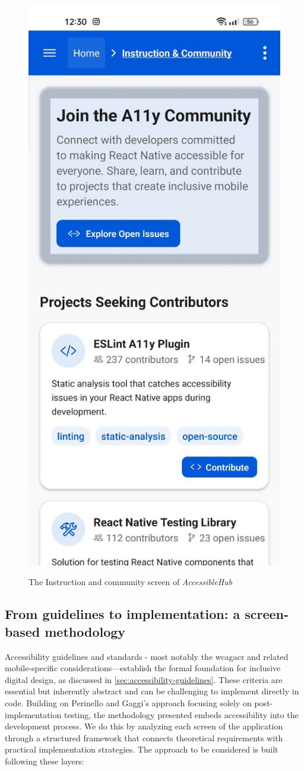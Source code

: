 \begin{enumerate}
\begin{figure}[ht]
\centering
\includegraphics[width=0.4\linewidth, alt={Screenshot of the Instruction and community screen of AccessibleHub}]{img/instruction-community.jpg}
\caption{The Instruction and community screen of \textit{AccessibleHub}}\label{fig:instruction-community}
\end{figure}
    
\end{enumerate}

\pagebreak

\subsection{From guidelines to implementation: a screen-based methodology}
\label{sec:accessiblehub-screen-methodology}

Accessibility guidelines and standards - most notably the \acrshort{wcagacr}  and related mobile-specific considerations—establish the formal foundation for inclusive digital design, as discussed in \ref{sec:accessibility-guidelines}. These criteria are essential but inherently abstract and can be challenging to implement directly in code. Building on Perinello and Gaggi's approach focusing solely on post-implementation testing, the methodology presented embeds accessibility into the development process. We do this by analyzing each screen of the application through a structured framework that connects theoretical requirements with practical implementation strategies. The approach to be considered is built following these layers:

